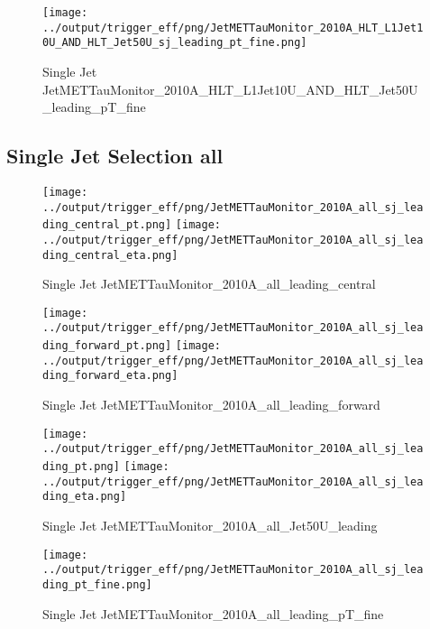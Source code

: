 \documentclass[11pt]{article}
\begin{document}
\begin{figure}[ht]
\centering
\texttt{[image: ../output/trigger\_eff/png/JetMETTauMonitor\_2010A\_HLT\_L1Jet10U\_AND\_HLT\_Jet50U\_sj\_leading\_pt\_fine.png]}
\caption{Single Jet JetMETTauMonitor\_2010A\_HLT\_L1Jet10U\_AND\_HLT\_Jet50U\_leading\_pT\_fine}
\label{fig:jetmettaumon_sj_HLT_L1Jet10U_AND_HLT_Jet50U_leading_pT_fine}
\end{figure}
\clearpage


\newpage
\subsection{Single Jet Selection all}
\begin{figure}[ht]
\centering
\texttt{[image: ../output/trigger\_eff/png/JetMETTauMonitor\_2010A\_all\_sj\_leading\_central\_pt.png]}
\texttt{[image: ../output/trigger\_eff/png/JetMETTauMonitor\_2010A\_all\_sj\_leading\_central\_eta.png]}
\caption{Single Jet JetMETTauMonitor\_2010A\_all\_leading\_central}
\label{fig:jetmettaumon_sj_all_leading_central}
\end{figure}

\begin{figure}[ht]
\centering
\texttt{[image: ../output/trigger\_eff/png/JetMETTauMonitor\_2010A\_all\_sj\_leading\_forward\_pt.png]}
\texttt{[image: ../output/trigger\_eff/png/JetMETTauMonitor\_2010A\_all\_sj\_leading\_forward\_eta.png]}
\caption{Single Jet JetMETTauMonitor\_2010A\_all\_leading\_forward}
\label{fig:jetmettaumon_sj_all_leading_forward}
\end{figure}

\begin{figure}[ht]
\centering
\texttt{[image: ../output/trigger\_eff/png/JetMETTauMonitor\_2010A\_all\_sj\_leading\_pt.png]}
\texttt{[image: ../output/trigger\_eff/png/JetMETTauMonitor\_2010A\_all\_sj\_leading\_eta.png]}
\caption{Single Jet JetMETTauMonitor\_2010A\_all\_Jet50U\_leading}
\label{fig:jetmettaumon_sj_all_leading}
\end{figure}

\begin{figure}[ht]
\centering
\texttt{[image: ../output/trigger\_eff/png/JetMETTauMonitor\_2010A\_all\_sj\_leading\_pt\_fine.png]}
\caption{Single Jet JetMETTauMonitor\_2010A\_all\_leading\_pT\_fine}
\label{fig:jetmettaumon_sj_all_leading_pT_fine}
\end{figure}
\clearpage
\end{document}
